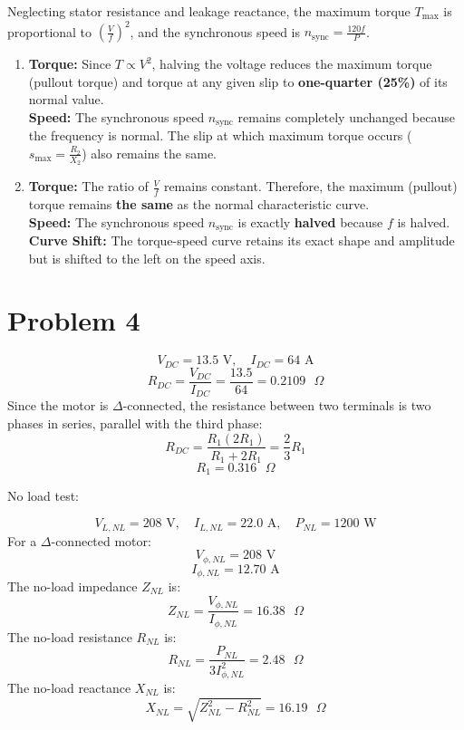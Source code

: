 \documentclass[12pt]{article}
\begin{document}
Neglecting stator resistance and leakage reactance, the maximum torque $T_{\text{max}}$ is proportional to $\left(\frac{V}{f}\right)^2$, and the synchronous speed is $n_{\text{sync}} = \frac{120f}{P}$.

\begin{enumerate}[label=(\alph*)]
	\item
	\textbf{Torque:} Since $T \propto V^2$, halving the voltage reduces the maximum torque (pullout torque) and torque at any given slip to \textbf{one-quarter (25\%)} of its normal value.\\
	\textbf{Speed:} The synchronous speed $n_{\text{sync}}$ remains completely unchanged because the frequency is normal. The slip at which maximum torque occurs ($s_{\text{max}} = \frac{R_2}{X_2}$) also remains the same. 
	
	\item 
	\textbf{Torque:} The ratio of $\frac{V}{f}$ remains constant. Therefore, the maximum (pullout) torque remains \textbf{the same} as the normal characteristic curve.\\
	\textbf{Speed:} The synchronous speed $n_{\text{sync}}$ is exactly \textbf{halved} because $f$ is halved.\\
	\textbf{Curve Shift:} The torque-speed curve retains its exact shape and amplitude but is shifted to the left on the speed axis. 
\end{enumerate}

\newpage

\section*{Problem 4}


\[ V_{DC} = 13.5 \text{ V}, \quad I_{DC} = 64 \text{ A} \]
\[ R_{DC} = \frac{V_{DC}}{I_{DC}} = \frac{13.5}{64} = 0.2109 \text{ }\Omega \]
Since the motor is $\Delta$-connected, the resistance between two terminals is two phases in series, parallel with the third phase:
\[ R_{DC} = \frac{R_1(2R_1)}{R_1+2R_1} = \frac{2}{3}R_1 \]
\[ R_1 = 0.316 \text{ }\Omega \]

No load test:

\[ V_{L,NL} = 208 \text{ V}, \quad I_{L,NL} = 22.0 \text{ A}, \quad P_{NL} = 1200 \text{ W} \]
For a $\Delta$-connected motor:
\[ V_{\phi,NL} = 208 \text{ V} \]
\[ I_{\phi,NL} =  12.70 \text{ A} \]
The no-load impedance $Z_{NL}$ is:
\[ Z_{NL} = \frac{V_{\phi,NL}}{I_{\phi,NL}} = 16.38 \text{ }\Omega \]
The no-load resistance $R_{NL}$ is:
\[ R_{NL} = \frac{P_{NL}}{3 I_{\phi,NL}^2} = 2.48 \text{ }\Omega \]
The no-load reactance $X_{NL}$ is:
\[ X_{NL} = \sqrt{Z_{NL}^2 - R_{NL}^2} =16.19 \text{ }\Omega \]
\end{document}
